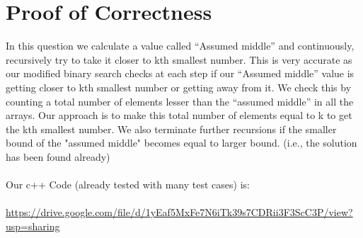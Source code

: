 \documentclass{article}
\begin{document}
\section{Proof of Correctness}
In this question we calculate a value called “Assumed middle” and continuously, recursively try to take it closer to kth smallest number. This is very accurate as our modified binary search checks at each step if our “Assumed middle” value is getting closer to kth smallest number or getting away from it. We check this by counting a total number of elements lesser than the “assumed middle” in all the arrays. Our approach is to make this total number of elements equal to k to get the kth smallest number. We also terminate further recursions if the smaller bound of the "assumed middle" becomes equal to larger bound. (i.e., the solution has been found already)
\\\\
Our c++ Code (already tested with many test cases) is:
\\\\
\url{https://drive.google.com/file/d/1yEaf5MxFe7N6iTk39s7CDRii3F3ScC3P/view?usp=sharing}
\end{document}
